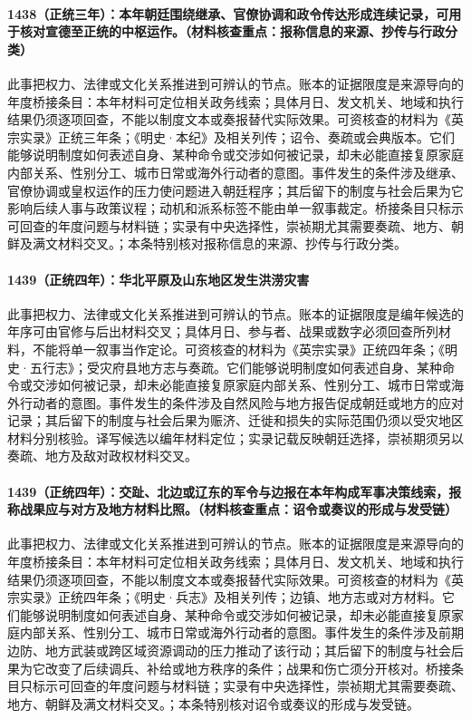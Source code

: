 \paragraph{1438（正统三年）：本年朝廷围绕继承、官僚协调和政令传达形成连续记录，可用于核对宣德至正统的中枢运作。（材料核查重点：报称信息的来源、抄传与行政分类）} 此事把权力、法律或文化关系推进到可辨认的节点。账本的证据限度是来源导向的年度桥接条目：本年材料可定位相关政务线索；具体月日、发文机关、地域和执行结果仍须逐项回查，不能以制度文本或奏报替代实际效果。可资核查的材料为《英宗实录》正统三年条；《明史·本纪》及相关列传；诏令、奏疏或会典版本。它们能够说明制度如何表述自身、某种命令或交涉如何被记录，却未必能直接复原家庭内部关系、性别分工、城市日常或海外行动者的意图。事件发生的条件涉及继承、官僚协调或皇权运作的压力使问题进入朝廷程序；其后留下的制度与社会后果为它影响后续人事与政策议程；动机和派系标签不能由单一叙事裁定。桥接条目只标示可回查的年度问题与材料链；实录有中央选择性，崇祯期尤其需要奏疏、地方、朝鲜及满文材料交叉。；本条特别核对报称信息的来源、抄传与行政分类。

\paragraph{1439（正统四年）：华北平原及山东地区发生洪涝灾害} 此事把权力、法律或文化关系推进到可辨认的节点。账本的证据限度是编年候选的年序可由官修与后出材料交叉；具体月日、参与者、战果或数字必须回查所列材料，不能将单一叙事当作定论。可资核查的材料为《英宗实录》正统四年条；《明史·五行志》；受灾府县地方志与奏疏。它们能够说明制度如何表述自身、某种命令或交涉如何被记录，却未必能直接复原家庭内部关系、性别分工、城市日常或海外行动者的意图。事件发生的条件涉及自然风险与地方报告促成朝廷或地方的应对记录；其后留下的制度与社会后果为赈济、迁徙和损失的实际范围仍须以受灾地区材料分别核验。译写候选以编年材料定位；实录记载反映朝廷选择，崇祯期须另以奏疏、地方及敌对政权材料交叉。

\paragraph{1439（正统四年）：交趾、北边或辽东的军令与边报在本年构成军事决策线索，报称战果应与对方及地方材料比照。（材料核查重点：诏令或奏议的形成与发受链）} 此事把权力、法律或文化关系推进到可辨认的节点。账本的证据限度是来源导向的年度桥接条目：本年材料可定位相关政务线索；具体月日、发文机关、地域和执行结果仍须逐项回查，不能以制度文本或奏报替代实际效果。可资核查的材料为《英宗实录》正统四年条；《明史·兵志》及相关列传；边镇、地方志或对方材料。它们能够说明制度如何表述自身、某种命令或交涉如何被记录，却未必能直接复原家庭内部关系、性别分工、城市日常或海外行动者的意图。事件发生的条件涉及前期边防、地方武装或跨区域资源调动的压力推动了该行动；其后留下的制度与社会后果为它改变了后续调兵、补给或地方秩序的条件；战果和伤亡须分开核对。桥接条目只标示可回查的年度问题与材料链；实录有中央选择性，崇祯期尤其需要奏疏、地方、朝鲜及满文材料交叉。；本条特别核对诏令或奏议的形成与发受链。

